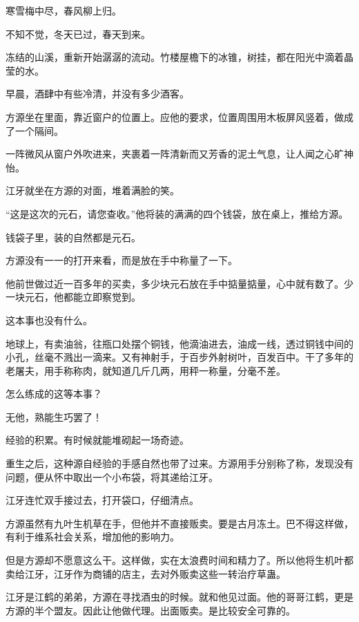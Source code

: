 
\begin{this_body}



寒雪梅中尽，春风柳上归。

不知不觉，冬天已过，春天到来。

冻结的山溪，重新开始潺潺的流动。竹楼屋檐下的冰锥，树挂，都在阳光中滴着晶莹的水。

早晨，酒肆中有些冷清，并没有多少酒客。

方源坐在里面，靠近窗户的位置上。应他的要求，位置周围用木板屏风竖着，做成了一个隔间。

一阵微风从窗户外吹进来，夹裹着一阵清新而又芳香的泥土气息，让人闻之心旷神怡。

江牙就坐在方源的对面，堆着满脸的笑。

“这是这次的元石，请您查收。”他将装的满满的四个钱袋，放在桌上，推给方源。

钱袋子里，装的自然都是元石。

方源没有一一的打开来看，而是放在手中称量了一下。

他前世做过近一百多年的买卖，多少块元石放在手中掂量掂量，心中就有数了。少一块元石，他都能立即察觉到。

这本事也没有什么。

地球上，有卖油翁，往瓶口处摆个铜钱，他滴油进去，油成一线，透过铜钱中间的小孔，丝毫不溅出一滴来。又有神射手，于百步外射树叶，百发百中。干了多年的老屠夫，用手称称肉，就知道几斤几两，用秤一称量，分毫不差。

怎么练成的这等本事？

无他，熟能生巧罢了！

经验的积累。有时候就能堆砌起一场奇迹。

重生之后，这种源自经验的手感自然也带了过来。方源用手分别称了称，发现没有问题，便从怀中取出一个小布袋，将其递给江牙。

江牙连忙双手接过去，打开袋口，仔细清点。

方源虽然有九叶生机草在手，但他并不直接贩卖。要是古月冻土。巴不得这样做，有利于维系社会关系，增加他的影响力。

但是方源却不愿意这么干。这样做，实在太浪费时间和精力了。所以他将生机叶都卖给江牙，江牙作为商铺的店主，去对外贩卖这些一转治疗草蛊。

江牙是江鹤的弟弟，方源在寻找酒虫的时候。就和他见过面。他的哥哥江鹤，更是方源的半个盟友。因此让他做代理。出面贩卖。是比较安全可靠的。


\end{this_body}
